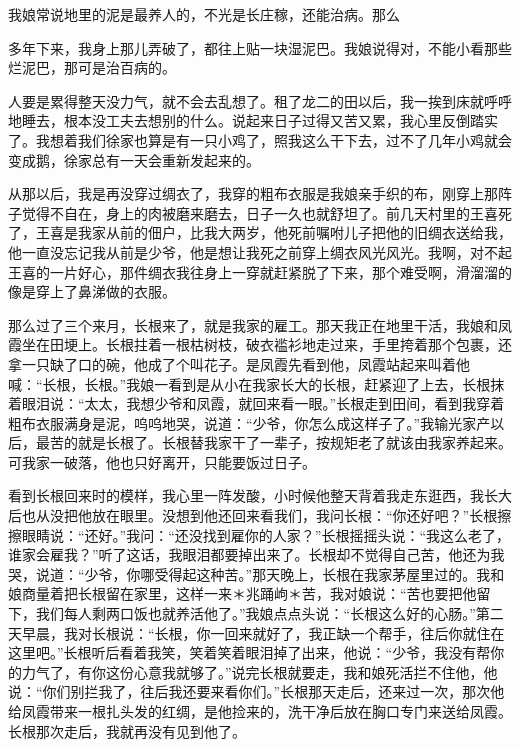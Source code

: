 \documentclass[12pt,UTF8]{ctexbook}
\begin{document}
我娘常说地里的泥是最养人的，不光是长庄稼，还能治病。那么


多年下来，我身上那儿弄破了，都往上贴一块湿泥巴。我娘说得对，不能小看那些烂泥巴，那可是治百病的。

人要是累得整天没力气，就不会去乱想了。租了龙二的田以后，我一挨到床就呼呼地睡去，根本没工夫去想别的什么。说起来日子过得又苦又累，我心里反倒踏实了。我想着我们徐家也算是有一只小鸡了，照我这么干下去，过不了几年小鸡就会变成鹅，徐家总有一天会重新发起来的。

从那以后，我是再没穿过绸衣了，我穿的粗布衣服是我娘亲手织的布，刚穿上那阵子觉得不自在，身上的肉被磨来磨去，日子一久也就舒坦了。前几天村里的王喜死了，王喜是我家从前的佃户，比我大两岁，他死前嘱咐儿子把他的旧绸衣送给我，他一直没忘记我从前是少爷，他是想让我死之前穿上绸衣风光风光。我啊，对不起王喜的一片好心，那件绸衣我往身上一穿就赶紧脱了下来，那个难受啊，滑溜溜的像是穿上了鼻涕做的衣服。

那么过了三个来月，长根来了，就是我家的雇工。那天我正在地里干活，我娘和凤霞坐在田埂上。长根拄着一根枯树枝，破衣褴衫地走过来，手里挎着那个包裹，还拿一只缺了口的碗，他成了个叫花子。是凤霞先看到他，凤霞站起来叫着他喊：“长根，长根。”我娘一看到是从小在我家长大的长根，赶紧迎了上去，长根抹着眼泪说：“太太，我想少爷和凤霞，就回来看一眼。”长根走到田间，看到我穿着粗布衣服满身是泥，呜呜地哭，说道：“少爷，你怎么成这样子了。”我输光家产以后，最苦的就是长根了。长根替我家干了一辈子，按规矩老了就该由我家养起来。可我家一破落，他也只好离开，只能要饭过日子。

看到长根回来时的模样，我心里一阵发酸，小时候他整天背着我走东逛西，我长大后也从没把他放在眼里。没想到他还回来看我们，我问长根：“你还好吧？”长根擦擦眼睛说：“还好。”我问：“还没找到雇你的人家？”长根摇摇头说：“我这么老了，谁家会雇我？”听了这话，我眼泪都要掉出来了。长根却不觉得自己苦，他还为我哭，说道：“少爷，你哪受得起这种苦。”那天晚上，长根在我家茅屋里过的。我和娘商量着把长根留在家里，这样一来＊兆踊岣＊苦，我对娘说：“苦也要把他留下，我们每人剩两口饭也就养活他了。”我娘点点头说：“长根这么好的心肠。”第二天早晨，我对长根说：“长根，你一回来就好了，我正缺一个帮手，往后你就住在这里吧。”长根听后看着我笑，笑着笑着眼泪掉了出来，他说：“少爷，我没有帮你的力气了，有你这份心意我就够了。”说完长根就要走，我和娘死活拦不住他，他说：“你们别拦我了，往后我还要来看你们。”长根那天走后，还来过一次，那次他给凤霞带来一根扎头发的红绸，是他捡来的，洗干净后放在胸口专门来送给凤霞。长根那次走后，我就再没有见到他了。
\end{document}
